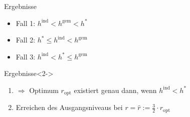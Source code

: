 \documentclass[beamer, xcolor={table,usenames,dvipsnames}]{beamer}
\newcommand{\cmark}{\ding{51}}%
\newcommand{\xmark}{\ding{55}}%
\begin{document}
    \begin{frame}{Ergebnisse}
    	\begin{itemize}
    		\item<1-> Fall 1: $h^\text{ind}< h^\text{gem} < h^*$ \cmark
    		\item<1-> Fall 2: $h^* \leq h^\text{ind} < h^\text{gem}$ \xmark
    		\item<1-> Fall 3: $h^\text{ind} < h^* \leq h^\text{gem}$ \cmark
    	\end{itemize}
    	\begin{block}{Ergebnisse}<2->
    		\begin{enumerate}
 			    \item<2-> $\Rightarrow$ Optimum $r_\text{opt}$ existiert genau dann, wenn $h^\text{ind} < h^*$
 			    \item<3-> Erreichen des Ausgangsniveaus bei $r = \hat{r} := \frac{3}{2} \cdot r_\text{opt}$
    		\end{enumerate}
    	\end{block}
    	\centering
    	\only<4->{}
    \end{frame}    
    
\end{document}
